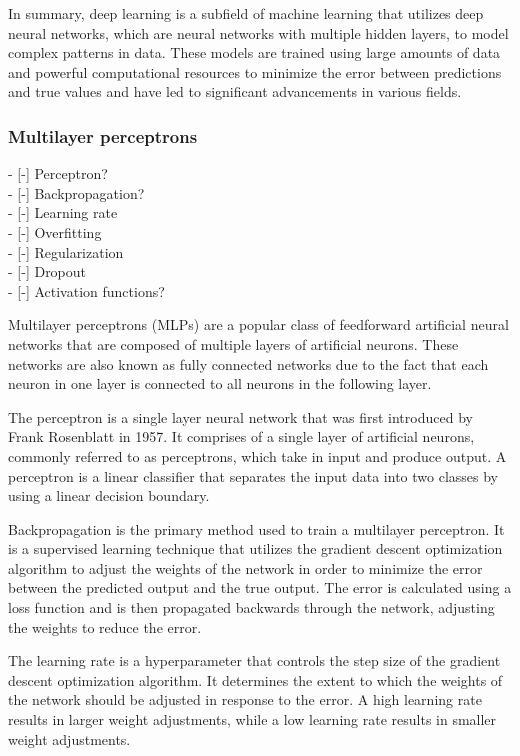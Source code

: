 In summary, deep learning is a subfield of machine learning that utilizes deep neural networks, which are neural networks with multiple hidden layers, to model complex patterns in data. These models are trained using large amounts of data and powerful computational resources to minimize the error between predictions and true values and have led to significant advancements in various fields.

\subsubsection{Multilayer perceptrons}
- [-] Perceptron?\\
- [-] Backpropagation?\\
- [-] Learning rate\\
- [-] Overfitting\\
- [-] Regularization\\
- [-] Dropout\\
- [-] Activation functions?

Multilayer perceptrons (MLPs) are a popular class of feedforward artificial neural networks that are composed of multiple layers of artificial neurons. These networks are also known as fully connected networks due to the fact that each neuron in one layer is connected to all neurons in the following layer.

The perceptron is a single layer neural network that was first introduced by Frank Rosenblatt in 1957. It comprises of a single layer of artificial neurons, commonly referred to as perceptrons, which take in input and produce output. A perceptron is a linear classifier that separates the input data into two classes by using a linear decision boundary.

Backpropagation is the primary method used to train a multilayer perceptron. It is a supervised learning technique that utilizes the gradient descent optimization algorithm to adjust the weights of the network in order to minimize the error between the predicted output and the true output. The error is calculated using a loss function and is then propagated backwards through the network, adjusting the weights to reduce the error.

The learning rate is a hyperparameter that controls the step size of the gradient descent optimization algorithm. It determines the extent to which the weights of the network should be adjusted in response to the error. A high learning rate results in larger weight adjustments, while a low learning rate results in smaller weight adjustments.

